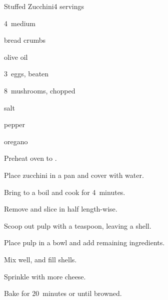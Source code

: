 \begin{recipe}{Stuffed Zucchini}{}{4 servings}

\begin{ingredients}
\item 4~medium 
\item \C{\half} bread crumbs
\item {} olive oil
\item 3~eggs, beaten
\item \C{\half} 
\item 8~mushrooms, chopped
\item salt
\item pepper
\item oregano
\end{ingredients}

\begin{directions}
\item Preheat oven to .
\item Place zucchini in a pan and cover with water.
\item Bring to a boil and cook for 4~minutes.
\item Remove and slice in half length-wise.
\item Scoop out pulp with a teaspoon, leaving a shell.
\item Place pulp in a bowl and add remaining ingredients.
\item Mix well, and fill shells.
\item Sprinkle with more cheese.
\item Bake for 20~minutes or until browned.
\end{directions}

\hint{}
\end{recipe}
